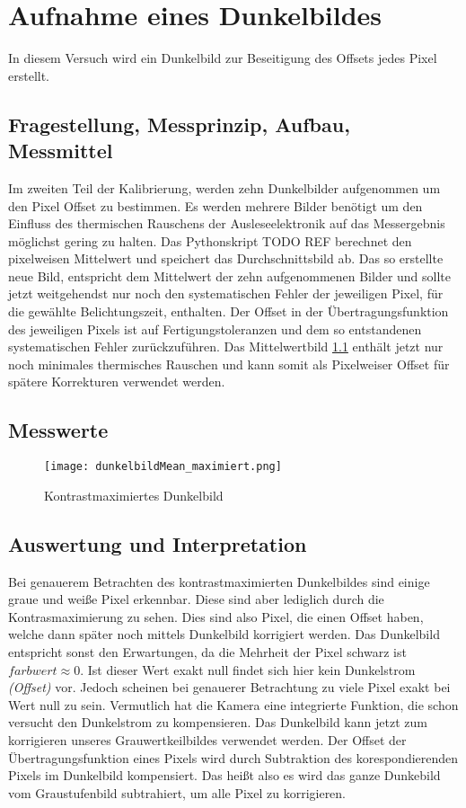 %
%
\chapter{Aufnahme eines Dunkelbildes}
In diesem Versuch wird ein Dunkelbild zur Beseitigung des Offsets jedes Pixel erstellt.
\label{chap:Aufnahme_eines_Dunkelbildes}

\section{Fragestellung, Messprinzip, Aufbau, Messmittel}
Im zweiten Teil der Kalibrierung, werden zehn Dunkelbilder aufgenommen um den Pixel Offset zu bestimmen. Es werden mehrere Bilder benötigt um den Einfluss des thermischen Rauschens der Ausleseelektronik auf das Messergebnis möglichst gering zu halten. Das Pythonskript TODO REF berechnet den pixelweisen Mittelwert und speichert das Durchschnittsbild ab. Das so erstellte neue Bild, entspricht dem Mittelwert der zehn aufgenommenen Bilder und sollte jetzt weitgehendst nur noch den systematischen Fehler der jeweiligen Pixel, für die gewählte Belichtungszeit, enthalten. Der Offset in der Übertragungsfunktion des jeweiligen Pixels ist auf Fertigungstoleranzen und dem so entstandenen systematischen Fehler zurückzuführen. Das Mittelwertbild \ref{img:dunkelbild_kontrastmax} enthält jetzt nur noch minimales thermisches Rauschen und kann somit als Pixelweiser Offset für spätere Korrekturen verwendet werden.
\label{chap:VERSUCH_2_FRAGESTELLUNG}

\section{Messwerte}
\begin{figure}[H]
\centering
\texttt{[image: dunkelbildMean\_maximiert.png]}
\caption{Kontrastmaximiertes Dunkelbild}
\label{img:dunkelbild_kontrastmax}
\end{figure}
\label{chap:VERSUCH_2_MESSWERTE}

\section{Auswertung und Interpretation}
\label{chap:VERSUCH_2_AUSWERTUNG}
Bei genauerem Betrachten des kontrastmaximierten Dunkelbildes sind einige graue und weiße Pixel erkennbar. Diese sind aber lediglich durch die Kontrasmaximierung zu sehen. Dies sind also Pixel, die einen Offset haben, welche dann später noch mittels Dunkelbild korrigiert werden.
Das Dunkelbild entspricht sonst den Erwartungen, da die Mehrheit der Pixel schwarz ist $farbwert \approx 0$. Ist dieser Wert exakt null findet sich hier kein Dunkelstrom \textit{(Offset)} vor. Jedoch scheinen bei genauerer Betrachtung zu viele Pixel exakt bei Wert null zu sein. Vermutlich hat die Kamera eine integrierte Funktion, die schon versucht den Dunkelstrom zu kompensieren.
Das Dunkelbild kann jetzt zum korrigieren unseres Grauwertkeilbildes verwendet werden. Der Offset der Übertragungsfunktion eines Pixels wird durch Subtraktion des korespondierenden Pixels im Dunkelbild kompensiert. Das heißt also es wird das ganze Dunkebild vom Graustufenbild subtrahiert, um alle Pixel zu korrigieren.
